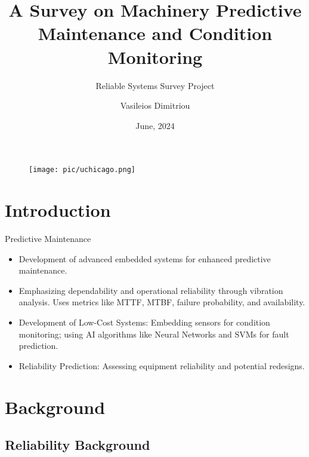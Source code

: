 \documentclass{beamer}
\author{Vasileios Dimitriou}
\title{A Survey on Machinery Predictive Maintenance and Condition Monitoring}
\subtitle{Reliable Systems Survey Project}
\institute{
	Department of Electrical and Software Engineering \\
	University of Thessaly
}
\date{\small June, 2024}
\begin{document}
	
	\begin{frame}
		\titlepage
		\vspace*{-0.6cm}
		\begin{figure}[htpb]
			\begin{center}
				\texttt{[image: pic/uchicago.png]}
			\end{center}
		\end{figure}
	\end{frame}
	
	\begin{frame}    
		\tableofcontents[sectionstyle=show,
		subsectionstyle=show/shaded/hide,
		subsubsectionstyle=show/shaded/hide]
	\end{frame}
	
	\section{Introduction}
	
	\begin{frame}{Predictive Maintenance}
		\begin{itemize}[<+-| alert@+>] %
			\item Development of advanced embedded systems for enhanced predictive maintenance.
			\item Emphasizing dependability and operational reliability through vibration analysis. Uses metrics like MTTF, MTBF, failure probability, and availability.
			\item Development of Low-Cost Systems: Embedding sensors for condition monitoring; using AI algorithms like Neural Networks and SVMs for fault prediction.
			\item Reliability Prediction: Assessing equipment reliability and potential redesigns.
		\end{itemize}
	\end{frame}
	
	
	\section{Background}
	
	\subsection{Reliability Background}
	
\end{document}
